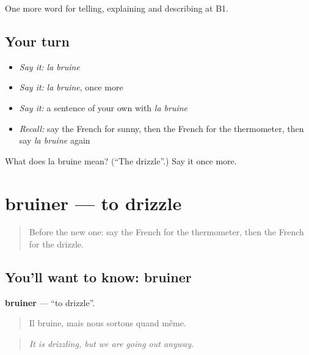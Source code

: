 \begin{grammarlens}[title={What you've built}]
One more word for telling, explaining and describing at B1.
\end{grammarlens}

\subsection*{Your turn}
\begin{itemize}
\raggedright
  \item \emph{Say it:} \emph{la bruine}
  \item \emph{Say it:} \emph{la bruine}, once more
  \item \emph{Say it:} a sentence of your own with \emph{la bruine}
  \item \emph{Recall:} say the French for sunny, then the French for the thermometer, then say \emph{la bruine} again
\end{itemize}

\begin{tcolorbox}[breakable,colback=teal!4,colframe=teal!35!black,title={Before you move on}]
What does la bruine mean? (\textquotedblleft{}The drizzle\textquotedblright{}.) Say it once more.
\end{tcolorbox}
\section[bruiner]{bruiner — to drizzle}

\label{lesson:FR-C461-bruiner}



\begin{quote}
Before the new one: say the French for the thermometer, then the French for the drizzle.
\end{quote}

\subsection*{You'll want to know: bruiner}
\textbf{bruiner} — \textquotedblleft{}to drizzle\textquotedblright{}.

\begin{quote}
Il bruine, mais nous sortons quand même.
\end{quote}

\begin{quote}
\emph{It is drizzling, but we are going out anyway.}
\end{quote}

